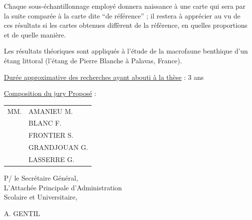 Chaque sous-échantillonnage employé donnera naissance à une carte qui sera par la suite comparée à la carte dite ``de référence'' ; il restera à apprécier au vu de ces résultats si les cartes obtenues diffèrent de la référence, en quelles proportions et de quelle manière.

Les résultats théoriques sont appliqués à l'étude de la macrofaune benthique d'un étang littoral (l'étang de Pierre Blanche à Palavas, France).

\uline{Durée approximative des recherches ayant abouti à la thèse} : 3 ans

\uline{Composition du jury Proposé} : \begin{tabular}[t]{ll}
MM. & AMANIEU M.\\
& BLANC F.\\
& FRONTIER S.\\
& GRANDJOUAN G.\\
& LASSERRE G.
\end{tabular}

\begin{flushright}
P/ le Secrétaire Général,\\
L'Attachée Principale d'Administration\\
Scolaire et Universitaire,


A. GENTIL
\end{flushright}


